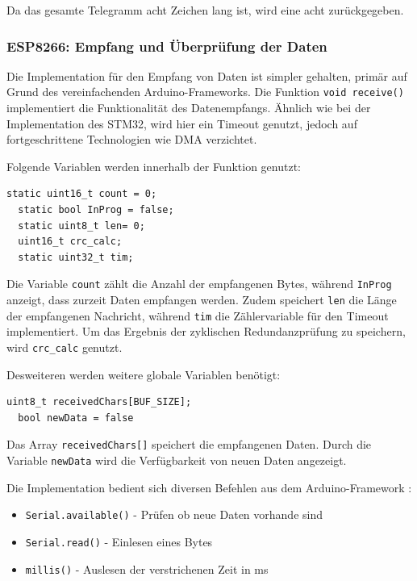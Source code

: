 \smallskip

Da das gesamte Telegramm acht Zeichen lang ist, wird eine acht zurückgegeben.


\subsubsection{ESP8266: Empfang und Überprüfung der Daten}

Die Implementation für den Empfang von Daten ist simpler gehalten, primär auf Grund des vereinfachenden Arduino-Frameworks. Die Funktion \lstinline!void receive()!
implementiert die Funktionalität des Datenempfangs. Ähnlich wie bei der Implementation des STM32, wird hier ein Timeout genutzt, jedoch auf fortgeschrittene 
Technologien wie \ac{DMA} verzichtet.

\smallskip

Folgende Variablen werden innerhalb der Funktion genutzt:

\begin{lstlisting}[caption={\textit{Variablen receive()}}]
  static uint16_t count = 0;
  static bool InProg = false;
  static uint8_t len= 0;
  uint16_t crc_calc;
  static uint32_t tim;  
\end{lstlisting}

Die Variable \lstinline!count! zählt die Anzahl der empfangenen Bytes, während \lstinline!InProg! anzeigt, dass zurzeit Daten empfangen werden. Zudem speichert
\lstinline!len! die Länge der empfangenen Nachricht, während \lstinline!tim! die Zählervariable für den Timeout implementiert. Um das Ergebnis der zyklischen
Redundanzprüfung zu speichern, wird \lstinline!crc_calc! genutzt.

\smallskip

Desweiteren werden weitere globale Variablen benötigt:

\begin{lstlisting}[caption={\textit{Globale Variablen receive()}}]
  uint8_t receivedChars[BUF_SIZE];   
  bool newData = false
\end{lstlisting}

Das Array \lstinline!receivedChars[]! speichert die empfangenen Daten. Durch die Variable \lstinline!newData! wird die Verfügbarkeit von neuen Daten angezeigt.

\smallskip

Die Implementation bedient sich diversen Befehlen aus dem Arduino-Framework \citep{ArduinoRef}:

\begin{itemize}
  \item \lstinline!Serial.available()! - Prüfen ob neue Daten vorhande sind
  \item \lstinline!Serial.read()! - Einlesen eines Bytes 
  \item \lstinline!millis()! - Auslesen der verstrichenen Zeit in ms
\end{itemize}

